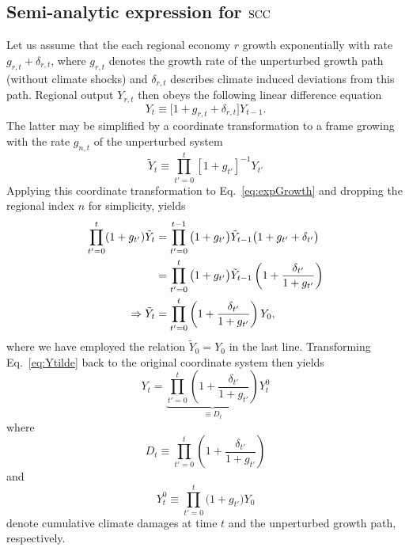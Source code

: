 \documentclass[preprint,3p,authoryear]{elsarticle}
\begin{document}
\subsection{Semi-analytic expression for $\operatorname{SCC}$}
\label{subsec:analytSCC}
Let us assume that the each regional economy $r$ growth exponentially with rate $g_{r,t}+\delta_{r,t}$, where $g_{r,t}$ denotes the growth rate of the unperturbed growth path (without climate shocks) and $\delta_{r,t}$ describes climate induced deviations from this path. Regional output $Y_{r,t}$ then obeys the following linear difference equation
\begin{equation}
  \label{eq:expGrowth}
  Y_t\equiv\big[1+g_{r,t}+\delta_{r,t}\big]Y_{t-1}.
\end{equation}
The latter may be simplified by a coordinate transformation to a frame growing with the rate $g_{n,t}$ of the unperturbed system
\begin{equation}
  \label{eq:growFrame}
  \tilde{Y}_t\equiv\prod_{t'=0}^t\left[1+g_{t'}\right]^{-1}Y_{t'}
\end{equation}
Applying this coordinate transformation to Eq.~\eqref{eq:expGrowth} and dropping the regional index $n$ for simplicity, yields
\begin{align}
\prod_{t'=0}^t(1+g_{t'})\tilde{Y}_t &= \prod_{t'=0}^{t-1}\big(1+g_{t'}\big)\tilde{Y}_{t-1}\big(1+g_{t'}+\delta_{t'}\big)\notag\\                                   &=\prod_{t'=0}^{t}\big(1+g_{t'}\big)\tilde{Y}_{t-1}\left(1+\frac{\delta_{t'}}{1+g_{t'}}\right)\notag\\
  \Rightarrow \tilde{Y}_{t} &= \prod_{t'=0}^{t}\left(1+\frac{\delta_{t'}}{1+g_{t'}}\right)Y_0\label{eq:Ytilde},
\end{align}
where we have employed the relation $\tilde{Y}_0=Y_0$ in the last line. Transforming Eq.~\eqref{eq:Ytilde} back to the original coordinate system then yields
\begin{equation}
  \label{eq:1}
Y_t=\underbrace{\prod_{t'=0}^{t}\left(1+\frac{\delta_{t'}}{1+g_{t'}}\right)}_{\equiv D_t}Y_t^0
\end{equation}
where
\begin{equation}
  \label{eq:D}
  D_t\equiv\prod_{t'=0}^{t}\left(1+\frac{\delta_{t'}}{1+g_{t'}}\right)
\end{equation}
and
\begin{equation}
  \label{eq:YNull}
 Y^0_t\equiv\prod_{t'=0}^{t} \big(1+g_{t'}\big)Y_0 
\end{equation}
 denote cumulative climate damages at time $t$ and the unperturbed growth path, respectively.
\end{document}
